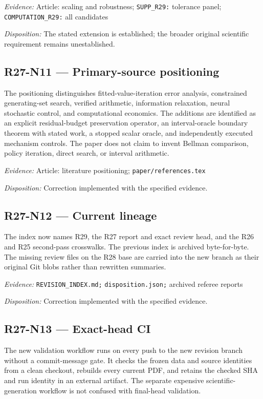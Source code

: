 \emph{Evidence:} Article: scaling and robustness; \nolinkurl{SUPP_R29:} tolerance panel; \nolinkurl{COMPUTATION_R29:} all candidates

\emph{Disposition:} The stated extension is established; the broader original scientific requirement remains unestablished.
\subsection{R27-N11 --- Primary-source positioning}
The positioning distinguishes fitted-value-iteration error analysis, constrained generating-set search, verified arithmetic, information relaxation, neural stochastic control, and computational economics. The additions are identified as an explicit residual-budget preservation operator, an interval-oracle boundary theorem with stated work, a stopped scalar oracle, and independently executed mechanism controls. The paper does not claim to invent Bellman comparison, policy iteration, direct search, or interval arithmetic.

\emph{Evidence:} Article: literature positioning; \nolinkurl{paper/references.tex}

\emph{Disposition:} Correction implemented with the specified evidence.
\subsection{R27-N12 --- Current lineage}
The index now names R29, the R27 report and exact review head, and the R26 and R25 second-pass crosswalks. The previous index is archived byte-for-byte. The missing review files on the R28 base are carried into the new branch as their original Git blobs rather than rewritten summaries.

\emph{Evidence:} \nolinkurl{REVISION_INDEX.md;} \nolinkurl{disposition.json;} archived referee reports

\emph{Disposition:} Correction implemented with the specified evidence.
\subsection{R27-N13 --- Exact-head CI}
The new validation workflow runs on every push to the new revision branch without a commit-message gate. It checks the frozen data and source identities from a clean checkout, rebuilds every current PDF, and retains the checked SHA and run identity in an external artifact. The separate expensive scientific-generation workflow is not confused with final-head validation.


